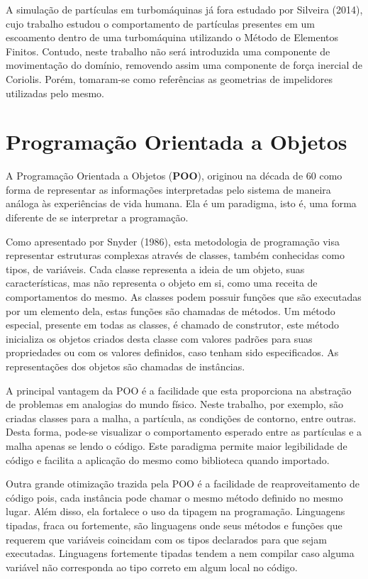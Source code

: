 A simulação de partículas em turbomáquinas já fora estudado por Silveira (2014)\cite{silveira}, cujo trabalho estudou o comportamento de partículas presentes em um escoamento dentro de uma turbomáquina utilizando o Método de Elementos Finitos.
Contudo, neste trabalho não será introduzida uma componente de movimentação do domínio, removendo assim uma componente de força inercial de Coriolis.
Porém, tomaram-se como referências as geometrias de impelidores utilizadas pelo mesmo.


\section{\textbf{Programação Orientada a Objetos}}
\label{sec_rev_POO}
A Programação Orientada a Objetos (\textbf{POO}), originou na década de 60 como forma de representar as informações interpretadas pelo sistema de maneira análoga às experiências de vida humana.
Ela é um paradigma, isto é, uma forma diferente de se interpretar a programação.

Como apresentado por Snyder (1986)\cite{Snyder-1986}, esta metodologia de programação visa representar estruturas complexas através de classes, também conhecidas como tipos, de variáveis.
Cada classe representa a ideia de um objeto, suas características, mas não representa o objeto em si, como uma receita de comportamentos do mesmo.
As classes podem possuir funções que são executadas por um elemento dela, estas funções são chamadas de métodos.
Um método especial, presente em todas as classes, é chamado de construtor, este método inicializa os objetos criados desta classe com valores padrões para suas propriedades ou com os valores definidos, caso tenham sido especificados.
As representações dos objetos são chamadas de instâncias.

A principal vantagem da POO é a facilidade que esta proporciona na abstração de problemas em analogias do mundo físico.
Neste trabalho, por exemplo, são criadas classes para a malha, a partícula, as condições de contorno, entre outras.
Desta forma, pode-se visualizar o comportamento esperado entre as partículas e a malha apenas se lendo o código.
Este paradigma permite maior legibilidade de código e facilita a aplicação do mesmo como biblioteca quando importado.

Outra grande otimização trazida pela POO é a facilidade de reaproveitamento de código pois, cada instância pode chamar o mesmo método definido no mesmo lugar.
Além disso, ela fortalece o uso da tipagem na programação.
Linguagens tipadas, fraca ou fortemente, são linguagens onde seus métodos e funções que requerem que variáveis coincidam com os tipos declarados para que sejam executadas.
Linguagens fortemente tipadas tendem a nem compilar caso alguma variável não corresponda ao tipo correto em algum local no código.

